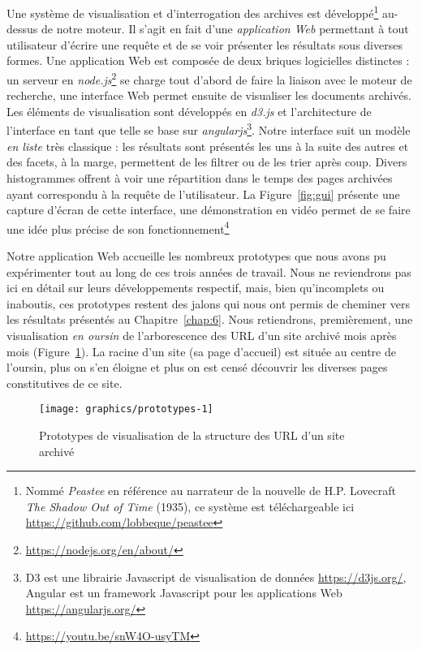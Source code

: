 \documentclass[symmetric,justified,marginals=raggedouter]{tufte-book}
\begin{document}
\noindent Une système de visualisation et d'interrogation des archives est dé\-veloppé\footnote{\RaggedOuter Nommé \textit{Peastee} en référence au narrateur de la nouvelle de H.P. Lovecraft \textit{The Shadow Out of Time} (1935), ce système est téléchargeable ici \url{https://github.com/lobbeque/peastee}} au-dessus de notre moteur. Il s'agit en fait d'une \textit{application Web} permettant à tout utilisateur d'écrire une requête et de se voir présenter les résultats sous diverses formes. Une application Web est composée de deux briques logicielles distinctes : un serveur en \textit{node.js}\footnote{\RaggedOuter \url{https://nodejs.org/en/about/}} se charge tout d'abord de faire la liaison avec le moteur de recherche, une interface Web permet ensuite de visualiser les documents archivés. Les éléments de visualisation sont développés en \textit{d3.js} et l'architecture de l'interface en tant que telle se base sur \textit{angularjs}\footnote{\RaggedOuter D3 est une librairie Javascript de visualisation de données \url{https://d3js.org/}, Angular est un framework Javascript pour les applications Web \url{https://angularjs.org/}}. Notre interface suit un modèle \textit{en liste} très classique : les résultats sont présentés les uns à la suite des autres et des facets, à la marge, permettent de les filtrer ou de les trier après coup. Divers histogrammes offrent à voir une répartition dans le temps des pages archivées ayant correspondu à la requête de l'utilisateur. La Figure~\ref{fig:gui} présente une capture d'écran de cette interface, une démonstration en vidéo permet de se faire une idée plus précise de son fonctionnement\footnote{\RaggedOuter \url{https://youtu.be/snW4O-usyTM}}

Notre application Web accueille les nombreux prototypes que nous avons pu expérimenter tout au long de ces trois années de travail. Nous ne reviendrons pas ici en détail sur leurs développements respectif, mais, bien qu'incomplets ou inaboutis, ces prototypes restent des jalons qui nous ont permis de cheminer vers les résultats présentés au Chapitre~\ref{chap:6}. Nous retiendrons, premièrement, une visualisation \textit{en oursin} de l'arborescence des URL d'un site archivé mois après mois (Figure~\ref{fig:prototypes-1}). La racine d'un site (sa page d'accueil) est située au centre de l'oursin, plus on s'en éloigne et plus on est censé découvrir les diverses pages constitutives de ce site. 

\begin{figure}%
  \texttt{[image: graphics/prototypes-1]}
  \caption{Prototypes de visualisation de la structure des URL d'un site archivé}
  \label{fig:prototypes-1}
\end{figure}
\end{document}
